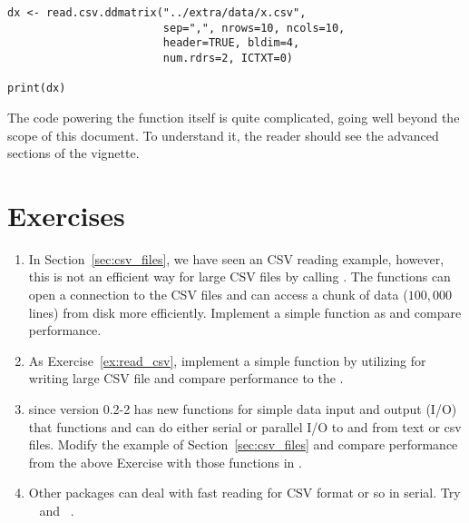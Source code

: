 \begin{lstlisting}[language=rr,title=Reading a CSV with Multiple Readers]
dx <- read.csv.ddmatrix("../extra/data/x.csv", 
                        sep=",", nrows=10, ncols=10, 
                        header=TRUE, bldim=4, 
                        num.rdrs=2, ICTXT=0)

print(dx)
\end{lstlisting}

The code powering the function itself is quite complicated, going well beyond the scope of this document.  To understand it, the reader should see the advanced sections of the  vignette.


\section{Exercises}
\label{sec:reading_exercise}

\begin{enumerate}[label=\thechapter-\arabic*]
\item \label{ex:read_csv}
In Section~\ref{sec:csv_files}, we have seen an CSV reading example, however,
this is not an efficient way for large CSV files by calling .
The  functions  can open a connection to
the CSV files and  can access a chunk of
data ($100,000$ lines)
from disk more efficiently. Implement a simple function as 
and compare performance.

\item
As Exercise~\ref{ex:read_csv}, implement a simple function by utilizing
 for writing large CSV file and compare performance
to the .

\item
{} since version 0.2-2 has new functions for simple data input
and output (I/O) that functions  and 
can do either serial or parallel I/O to and from text or csv files.
Modify the example of Section~\ref{sec:csv_files} and
compare performance from the above Exercise with those functions in
.

\item
Other  packages can deal with fast reading for CSV format or so
in serial. Try ~\citep{ff} and
~\citep{bigmemory}.

\end{enumerate}
